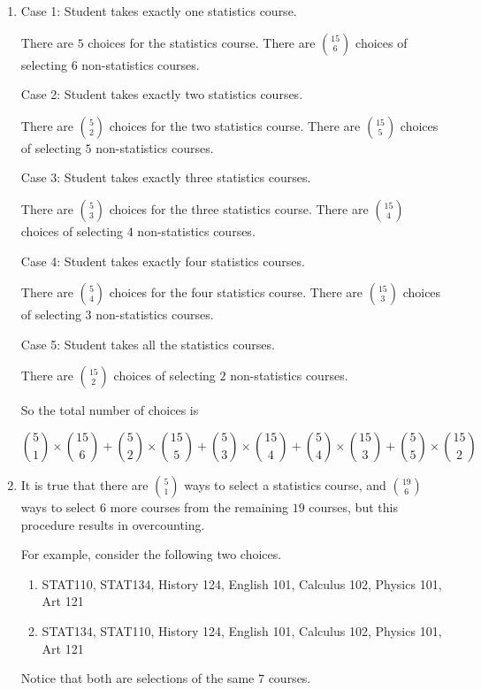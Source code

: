 \begin{enumerate}[label=(\alph*)]
\item Case 1: Student takes exactly one statistics course.
  
  There are $5$ choices for the statistics course. There are ${15 \choose 6}$ 
  choices of selecting $6$ non-statistics courses.
  
  Case 2: Student takes exactly two statistics courses.
  
  There are ${5 \choose 2}$ choices for the two statistics course. 
  There are ${15 \choose 5}$ choices of selecting $5$ non-statistics courses.
  
  Case 3: Student takes exactly three statistics courses.
  
  There are ${5 \choose 3}$ choices for the three statistics course. 
  There are ${15 \choose 4}$ choices of selecting $4$ non-statistics courses.
  
  Case 4: Student takes exactly four statistics courses.
  
  There are ${5 \choose 4}$ choices for the four statistics course. 
  There are ${15 \choose 3}$ choices of selecting $3$ non-statistics courses.
  
  Case 5: Student takes all the statistics courses.
  
  There are ${15 \choose 2}$ choices of selecting $2$ non-statistics courses.
  
  So the total number of choices is
  
  $${5 \choose 1} \times {15 \choose 6} + {5 \choose 2} \times {15 \choose 5} + 
  {5 \choose 3} \times {15 \choose 4} + {5 \choose 4} \times {15 \choose 3} + 
  {5 \choose 5} \times {15 \choose 2}$$

\item It is true that there are ${5 \choose 1}$ ways to select a statistics 
course, and ${19 \choose 6}$ ways to select $6$ more courses from the remaining 
$19$ courses, but this procedure results in overcounting.
  
  For example, consider the following two choices.
  
  \begin{enumerate}[label=(\alph*)]
  \item STAT110, STAT134, History 124, English 101, Calculus 102, Physics 101, Art 121
  \item STAT134, STAT110, History 124, English 101, Calculus 102, Physics 101, Art 121
  \end{enumerate}
  
  Notice that both are selections of the same $7$ courses.
\end{enumerate}